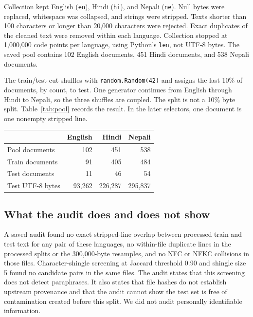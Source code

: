 \documentclass[10pt,twocolumn]{article}
\begin{document}
Collection kept English (\texttt{en}), Hindi (\texttt{hi}), and Nepali (\texttt{ne}).
Null bytes were replaced, whitespace was collapsed, and strings were stripped.
Texts shorter than 100 characters or longer than 20{,}000 characters were rejected.
Exact duplicates of the cleaned text were removed within each language.
Collection stopped at 1{,}000{,}000 code points per language, using Python's \texttt{len}, not UTF-8 bytes.
The saved pool contains 102 English documents, 451 Hindi documents, and 538 Nepali documents.

The train/test cut shuffles with \texttt{random.Random(42)} and assigns the last 10\% of documents, by count, to test.
One generator continues from English through Hindi to Nepali, so the three shuffles are coupled.
The split is not a 10\% byte split.
Table~\ref{tab:pool} records the result.
In the later selectors, one document is one nonempty stripped line.

\begin{center}
\small
\begin{tabular}{@{}lrrr@{}}
\toprule
 & English & Hindi & Nepali \\
\midrule
Pool documents & 102 & 451 & 538 \\
Train documents & 91 & 405 & 484 \\
Test documents & 11 & 46 & 54 \\
Test UTF-8 bytes & 93{,}262 & 226{,}287 & 295{,}837 \\
\bottomrule
\end{tabular}
\label{tab:pool}
\end{center}

\subsection{What the audit does and does not show}

A saved audit found no exact stripped-line overlap between processed train and test text for any pair of these languages, no within-file duplicate lines in the processed splits or the 300{,}000-byte resamples, and no NFC or NFKC collisions in those files.
Character-shingle screening at Jaccard threshold 0.90 and shingle size 5 found no candidate pairs in the same files.
The audit states that this screening does not detect paraphrases.
It also states that file hashes do not establish upstream provenance and that the audit cannot show the test set is free of contamination created before this split.
We did not audit personally identifiable information.
\end{document}
